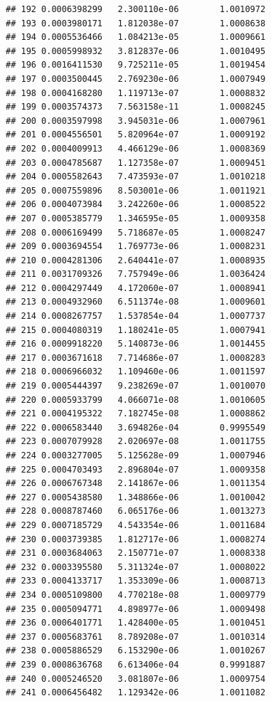 \documentclass{article}\usepackage[]{graphicx}\usepackage[]{xcolor}
\makeatletter
\newenvironment{kframe}{%
 \def\at@end@of@kframe{}%
 \ifinner\ifhmode%
  \def\at@end@of@kframe{\end{minipage}}%
  \begin{minipage}{\columnwidth}%
 \fi\fi%
 \def\FrameCommand##1{\hskip\@totalleftmargin \hskip-\fboxsep
 \colorbox{shadecolor}{##1}\hskip-\fboxsep
     \hskip-\linewidth \hskip-\@totalleftmargin \hskip\columnwidth}%
 \MakeFramed {\advance\hsize-\width
   \@totalleftmargin\z@ \linewidth\hsize
   \@setminipage}}%
 {\par\unskip\endMakeFramed%
 \at@end@of@kframe}
\newenvironment{knitrout}{}{} %
\makeatother
\begin{document}
\begin{knitrout}
\begin{kframe}
\begin{verbatim}
## 192 0.0006398299   2.300110e-06        1.0010972
## 193 0.0003980171   1.812038e-07        1.0008638
## 194 0.0005536466   1.084213e-05        1.0009661
## 195 0.0005998932   3.812837e-06        1.0010495
## 196 0.0016411530   9.725211e-05        1.0019454
## 197 0.0003500445   2.769230e-06        1.0007949
## 198 0.0004168280   1.119713e-07        1.0008832
## 199 0.0003574373   7.563158e-11        1.0008245
## 200 0.0003597998   3.945031e-06        1.0007961
## 201 0.0004556501   5.820964e-07        1.0009192
## 202 0.0004009913   4.466129e-06        1.0008369
## 203 0.0004785687   1.127358e-07        1.0009451
## 204 0.0005582643   7.473593e-07        1.0010218
## 205 0.0007559896   8.503001e-06        1.0011921
## 206 0.0004073984   3.242260e-06        1.0008522
## 207 0.0005385779   1.346595e-05        1.0009358
## 208 0.0006169499   5.718687e-05        1.0008247
## 209 0.0003694554   1.769773e-06        1.0008231
## 210 0.0004281306   2.640441e-07        1.0008935
## 211 0.0031709326   7.757949e-06        1.0036424
## 212 0.0004297449   4.172060e-07        1.0008941
## 213 0.0004932960   6.511374e-08        1.0009601
## 214 0.0008267757   1.537854e-04        1.0007737
## 215 0.0004080319   1.180241e-05        1.0007941
## 216 0.0009918220   5.140873e-06        1.0014455
## 217 0.0003671618   7.714686e-07        1.0008283
## 218 0.0006966032   1.109460e-06        1.0011597
## 219 0.0005444397   9.238269e-07        1.0010070
## 220 0.0005933799   4.066071e-08        1.0010605
## 221 0.0004195322   7.182745e-08        1.0008862
## 222 0.0006583440   3.694826e-04        0.9995549
## 223 0.0007079928   2.020697e-08        1.0011755
## 224 0.0003277005   5.125628e-09        1.0007946
## 225 0.0004703493   2.896804e-07        1.0009358
## 226 0.0006767348   2.141867e-06        1.0011354
## 227 0.0005438580   1.348866e-06        1.0010042
## 228 0.0008787460   6.065176e-06        1.0013273
## 229 0.0007185729   4.543354e-06        1.0011684
## 230 0.0003739385   1.812717e-06        1.0008274
## 231 0.0003684063   2.150771e-07        1.0008338
## 232 0.0003395580   5.311324e-07        1.0008022
## 233 0.0004133717   1.353309e-06        1.0008713
## 234 0.0005109800   4.770218e-08        1.0009779
## 235 0.0005094771   4.898977e-06        1.0009498
## 236 0.0006401771   1.428400e-05        1.0010451
## 237 0.0005683761   8.789208e-07        1.0010314
## 238 0.0005886529   6.153290e-06        1.0010267
## 239 0.0008636768   6.613406e-04        0.9991887
## 240 0.0005246520   3.081807e-06        1.0009754
## 241 0.0006456482   1.129342e-06        1.0011082

\end{verbatim}
\end{kframe}
\end{knitrout}
\end{document}
